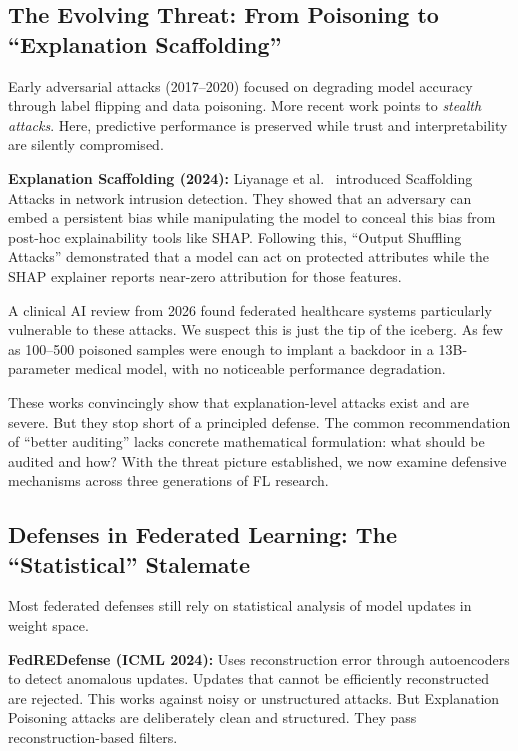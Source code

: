 \documentclass[journal]{IEEEtran}
\begin{document}
\subsection{The Evolving Threat: From Poisoning to ``Explanation Scaffolding''}

Early adversarial attacks (2017--2020) focused on degrading model accuracy through label flipping and data poisoning. More recent work points to \emph{stealth attacks}. Here, predictive performance is preserved while trust and interpretability are silently compromised.

\textbf{Explanation Scaffolding (2024):}
Liyanage et al.\ \cite{liyanage2024} introduced Scaffolding Attacks in network intrusion detection. They showed that an adversary can embed a persistent bias while manipulating the model to conceal this bias from post-hoc explainability tools like SHAP. Following this, ``Output Shuffling Attacks'' demonstrated that a model can act on protected attributes while the SHAP explainer reports near-zero attribution for those features.

A clinical AI review from 2026 found federated healthcare systems particularly vulnerable to these attacks. We suspect this is just the tip of the iceberg. As few as 100--500 poisoned samples were enough to implant a backdoor in a 13B-parameter medical model, with no noticeable performance degradation.

These works convincingly show that explanation-level attacks exist and are severe. But they stop short of a principled defense. The common recommendation of ``better auditing'' lacks concrete mathematical formulation: what should be audited and how? With the threat picture established, we now examine defensive mechanisms across three generations of FL research.

\subsection{Defenses in Federated Learning: The ``Statistical'' Stalemate}

Most federated defenses still rely on statistical analysis of model updates in weight space.

\textbf{FedREDefense (ICML 2024):}
Uses reconstruction error through autoencoders to detect anomalous updates. Updates that cannot be efficiently reconstructed are rejected. This works against noisy or unstructured attacks. But Explanation Poisoning attacks are deliberately clean and structured. They pass reconstruction-based filters.
\end{document}
